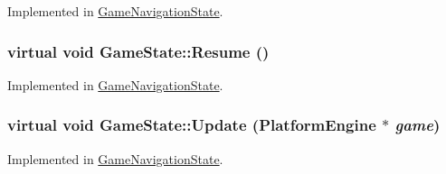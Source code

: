 Implemented in \hyperlink{class_game_navigation_state_ac626b511de8af9f32b7a1492a10f861}{GameNavigationState}.\hypertarget{class_game_state_cf9bcd5b47ebb3f572389f64c5ca5ed4}{
\subsubsection[{Resume}]{\setlength{\rightskip}{0pt plus 5cm}virtual void GameState::Resume ()}}
\label{dd/d87/class_game_state_cf9bcd5b47ebb3f572389f64c5ca5ed4}




Implemented in \hyperlink{class_game_navigation_state_4d6aee55eddb1978f493206d985fb950}{GameNavigationState}.\hypertarget{class_game_state_100ca49bc95afce1d5c5b756708bbc2b}{
\subsubsection[{Update}]{\setlength{\rightskip}{0pt plus 5cm}virtual void GameState::Update ({\bf PlatformEngine} $\ast$ {\em game})}}
\label{dd/d87/class_game_state_100ca49bc95afce1d5c5b756708bbc2b}




Implemented in \hyperlink{class_game_navigation_state_90f5e6d6287a875d8f2737180f46a004}{GameNavigationState}.